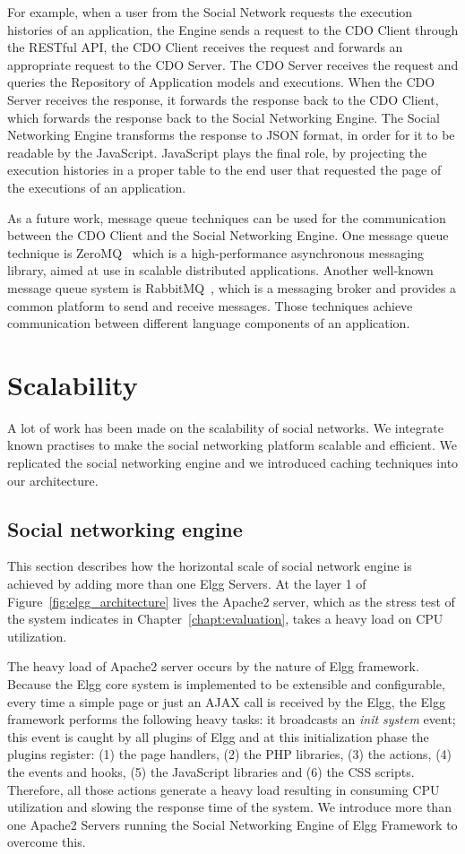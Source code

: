 For example, when a user from the Social Network requests the execution histories of an application, the Engine sends a request to the CDO Client through the RESTful API, the CDO Client receives the request and forwards an appropriate request to the CDO Server. The CDO Server receives the request and queries the Repository of Application models and executions. When the CDO Server receives the response, it forwards the response back to the CDO Client, which forwards the response back to the Social Networking Engine. The Social Networking Engine transforms the response to JSON format, in order for it to be readable by the JavaScript. JavaScript plays the final role, by projecting the execution histories in a proper table to the end user that requested the page of the executions of an application.

As a future work, message queue techniques can be used for the communication between the CDO Client and the Social Networking Engine. One message queue technique is ZeroMQ~\cite{zeromq_url} which is a high-performance asynchronous messaging library, aimed at use in scalable distributed applications. Another well-known message queue system is RabbitMQ~\cite{rabbitmq_url}, which is a messaging broker and provides a common platform to send and receive messages. Those techniques achieve communication between different language components of an application.

\section{Scalability}
A lot of work has been made on the scalability of social networks. We integrate known practises to make the social networking platform scalable and efficient. We replicated the social networking engine and we introduced caching techniques into our architecture.

\subsection{Social networking engine}
\label{sec:engine_scale}
This section describes how the horizontal scale of social network engine is achieved by adding more than one Elgg Servers. At the layer 1 of Figure~\ref{fig:elgg_architecture} lives the Apache2 server, which as the stress test of the system indicates in Chapter~\ref{chapt:evaluation}, takes a heavy load on CPU utilization. 

The heavy load of Apache2 server occurs by the nature of Elgg framework. Because the Elgg core system is implemented to be extensible and configurable, every time a simple page or just an AJAX call is received by the Elgg, the Elgg framework performs the following heavy tasks: it broadcasts an {\it init system} event; this event is caught by all plugins of Elgg and at this initialization phase the plugins register: (1) the page handlers, (2) the PHP libraries, (3) the actions, (4) the events and hooks, (5) the JavaScript libraries and (6) the CSS scripts. Therefore, all those actions generate a heavy load resulting in consuming CPU utilization and slowing the response time of the system. We introduce more than one Apache2 Servers running the Social Networking Engine of Elgg Framework to overcome this.  

